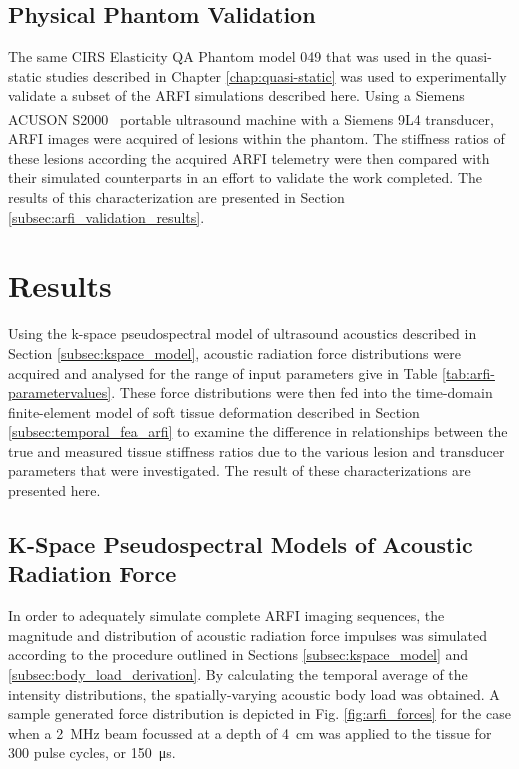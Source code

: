 		\FloatBarrier
		\subsection{Physical Phantom Validation}
			The same CIRS Elasticity QA Phantom model 049 that was used in the quasi-static studies described in Chapter \ref{chap:quasi-static} was used to experimentally validate a subset of the ARFI simulations described here. Using a Siemens ACUSON S2000\textsuperscript{\texttrademark}\  portable ultrasound machine with a Siemens 9L4  transducer, ARFI images were acquired of lesions within the phantom. The stiffness ratios of these lesions according the acquired ARFI telemetry were then compared with their simulated counterparts in an effort to validate the work completed. The results of this characterization are presented in Section \ref{subsec:arfi_validation_results}.

	\section{Results}
		Using the k-space pseudospectral model of ultrasound acoustics described in Section \ref{subsec:kspace_model}, acoustic radiation force distributions were acquired and analysed for the range of input parameters give in Table \ref{tab:arfi-parametervalues}. These force distributions were then fed into the time-domain finite-element model of soft tissue deformation described in Section \ref{subsec:temporal_fea_arfi} to examine the difference in relationships between the true and measured tissue stiffness ratios due to the various lesion and transducer parameters that were investigated. The result of these characterizations are presented here.

		\subsection{K-Space Pseudospectral Models of Acoustic Radiation Force}
		\label{subsec:kspace_results}
			In order to adequately simulate complete ARFI imaging sequences, the magnitude and distribution of acoustic radiation force impulses was simulated according to the procedure outlined in Sections \ref{subsec:kspace_model} and \ref{subsec:body_load_derivation}. By calculating the temporal average of the intensity distributions, the spatially-varying acoustic body load was obtained. A sample generated force distribution is depicted in Fig. \ref{fig:arfi_forces} for the case when a \SI{2}{\MHz} beam focussed at a depth of \SI{4}{\cm} was applied to the tissue for 300 pulse cycles, or \SI{150}{\us}.


